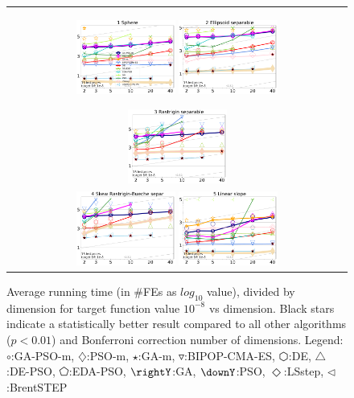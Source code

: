 \documentclass[runningheads]{llncs}
\begin{document}
\begin{figure}[h!tb]
  \begin{tabular}
      {c@{\hspace*{-0.00001\textwidth}}
      }
     
  \includegraphics[width=0.30\textwidth]{ppfigs_f001}
  \includegraphics[width=0.30\textwidth]{ppfigs_f002}

  \includegraphics[width=0.30\textwidth]{ppfigs_f003}\\
  \includegraphics[width=0.30\textwidth]{ppfigs_f004}
  
  \includegraphics[width=0.30\textwidth]{ppfigs_f005}
  \end{tabular}
  \vspace{-3ex}
   \caption{Average running time (in \#FEs as $log_{10}$ value),
    divided by dimension for target function value $10^{-8}$ vs dimension. 
    Black stars indicate a statistically better result compared to 
    all other algorithms ($p < 0.01$) and Bonferroni 
    correction number of dimensions. 
    Legend: {\color{NavyBlue}$\circ$}:GA-PSO-m, 
    {\color{Magenta}$\diamondsuit$}:PSO-m, 
    {\color{Orange}$\star$}:GA-m, 
    {\color{CornflowerBlue}$\triangledown$}:BIPOP-CMA-ES,
    {\color{red}$\varhexagon$}:DE, 
    {\color{YellowGreen}$\triangle$}:DE-PSO, 
    {\color{cyan}$\pentagon$}:EDA-PSO, 
    {\color{GreenYellow}$\rightY$}:GA, 
    {\color{ForestGreen}$\downY$}:PSO, 
    {\color{Lavender}$\Diamond$}:LSstep, 
    {\color{SkyBlue}$\triangleleft$}:BrentSTEP
    } 
  \label{fig:avg}
\end{figure}
\end{document}
